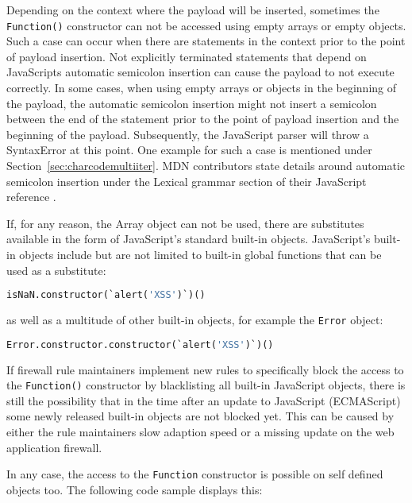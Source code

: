 Depending on the context where the payload will be inserted, sometimes the \verb|Function()| constructor can not be accessed using empty arrays or empty objects. Such a case can occur when there are statements in the context prior to the point of payload insertion. Not explicitly terminated statements that depend on JavaScripts automatic semicolon insertion can cause the payload to not execute correctly. In some cases, when using empty arrays or objects in the beginning of the payload, the automatic semicolon insertion might not insert a semicolon between the end of the statement prior to the point of payload insertion and the beginning of the payload. Subsequently, the JavaScript parser will throw a SyntaxError at this point. One example for such a case is mentioned under Section~\ref{sec:charcodemultiiter}. MDN contributors state details around automatic semicolon insertion under the Lexical grammar section of their JavaScript reference \cite{js/autosemi}.

If, for any reason, the Array object can not be used, there are substitutes available in the form of JavaScript's standard built-in objects.  
JavaScript's built-in objects include but are not limited to built-in global functions that can be used as a substitute: \cite{js/builtin}

\begin{lstlisting}[style=basicStyle,language=Python,escapeinside=\^\^]
isNaN.constructor(`alert('XSS')`)()
\end{lstlisting}

as well as a multitude of other built-in objects, for example the \verb|Error| object:

\begin{lstlisting}[style=basicStyle,language=Python,escapeinside=\^\^]
Error.constructor.constructor(`alert('XSS')`)()
\end{lstlisting}

If firewall rule maintainers implement new rules to specifically block the access to the \verb|Function()| constructor by blacklisting all built-in JavaScript objects, there is still the possibility that in the time after an update to JavaScript (ECMAScript) some newly released built-in objects are not blocked yet. This can be caused by either the rule maintainers slow adaption speed or a missing update on the web application firewall.

In any case, the access to the \verb|Function| constructor is possible on self defined objects too. The following code sample displays this:

